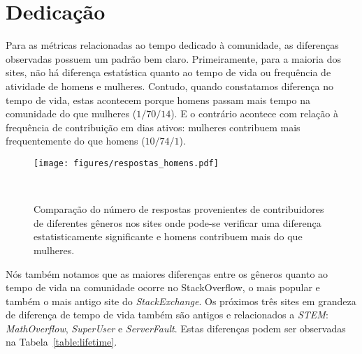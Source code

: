 

\section{Dedicação}%
Para as métricas relacionadas ao tempo dedicado à comunidade, as diferenças observadas possuem um padrão bem claro. Primeiramente, para a maioria dos sites, não há diferença estatística quanto ao tempo de vida ou frequência de atividade de homens e mulheres. Contudo, quando constatamos diferença no tempo de vida, estas acontecem porque homens passam mais tempo na comunidade do que mulheres ($1/70/14$). E o contrário acontece com relação à frequência de contribuição em dias ativos: mulheres contribuem mais frequentemente do que homens ($10/74/1$).

\begin{figure}[!b]
  \raggedleft
  \texttt{[image: figures/respostas\_homens.pdf]}
  \caption[Comparação do número de respostas em comunidades onde homens respondem mais.]{Comparação do número de respostas provenientes de contribuidores de diferentes gêneros nos sites onde pode-se verificar uma diferença estatisticamente significante e homens contribuem mais do que mulheres. }~\label{fig:answers-men}
\end{figure}

Nós também notamos que as maiores diferenças entre os gêneros quanto ao tempo de vida na comunidade ocorre no StackOverflow, o mais popular e também o mais antigo site do \emph{StackExchange}. Os próximos três sites em grandeza de diferença de tempo de vida também são antigos e relacionados a \emph{STEM}: \emph{MathOverflow}, \emph{SuperUser} e \emph{ServerFault}. Estas diferenças podem ser observadas na Tabela~\ref{table:lifetime}. 


